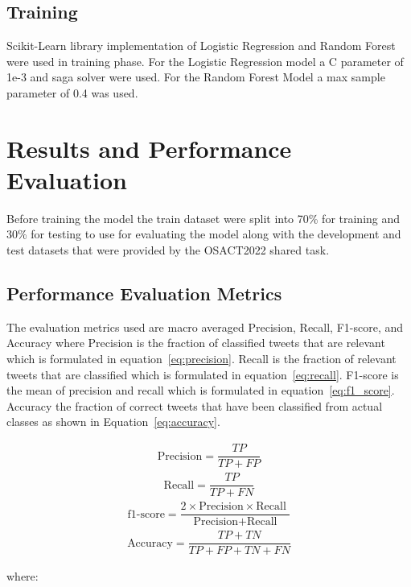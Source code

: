 \documentclass[10pt, a4paper, twoside, twocolumn]{article}
\begin{document}
\subsection{Training}
Scikit-Learn library implementation of Logistic Regression and Random Forest were used in training phase. For the Logistic Regression model a C parameter of 1e-3 and saga solver were used. For the Random Forest Model a max sample parameter of 0.4 was used.

\section{Results and Performance Evaluation}\label{sec:results_and_performance}
Before training the model the train dataset were split into 70\% for training and 30\% for testing to use for evaluating the model along with the development and test datasets that were provided by the OSACT2022 shared task.


\subsection{Performance Evaluation Metrics}
The evaluation metrics used are macro averaged Precision, Recall, F1-score, and Accuracy where Precision is the fraction of classified tweets that are relevant which is formulated in equation~\ref{eq:precision}. Recall is the fraction of relevant tweets that are classified which is formulated in equation~\ref{eq:recall}. F1-score is the mean of precision and recall which is formulated in equation~\ref{eq:f1_score}. Accuracy the fraction of correct tweets that have been classified from actual classes as shown in Equation~\ref{eq:accuracy}.

\begin{align}\label{eq:precision}
	\text{Precision} = \dfrac{TP}{TP + FP}
\end{align}
\begin{align}\label{eq:recall}
	\text{Recall}=\dfrac{TP}{TP + FN}
\end{align}
\begin{align}\label{eq:f1_score}
	\text{f1-score}=\dfrac{2 \times \text{Precision} \times \text{Recall }}{\text{Precision} + \text{Recall} }
\end{align}
\begin{align}\label{eq:accuracy}
	\text{Accuracy} = \dfrac{TP + TN}{TP + FP + TN + FN}
\end{align}

where:
\end{document}
